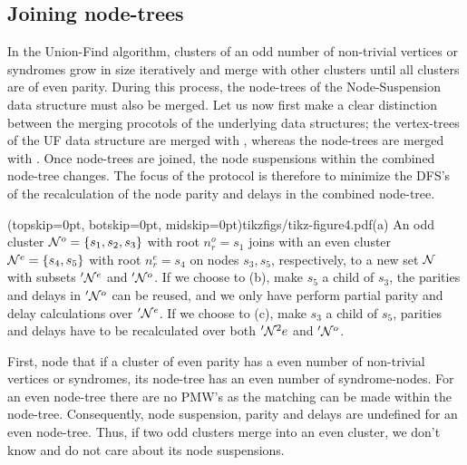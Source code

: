 \subsection{Joining node-trees}\label{sec:nodejoin}

In the Union-Find algorithm, clusters of an odd number of non-trivial vertices or syndromes grow in size iteratively and merge with other clusters until all clusters are of even parity. During this process, the node-trees of the Node-Suspension data structure must also be merged. Let us now first make a clear distinction between the merging procotols of the underlying data structures; the vertex-trees of the UF data structure are merged with , whereas the node-trees are merged with . Once node-trees are joined, the node suspensions within the combined node-tree changes. The focus of the  protocol is therefore to minimize the DFS's of the recalculation of the node parity and delays in the combined node-tree. 

\Figure[htb](topskip=0pt, botskip=0pt, midskip=0pt){tikzfigs/tikz-figure4.pdf}{(a) An odd cluster $\mathcal{N}^o=\{s_1, s_2, s_3\}$ with root $n^o_r = s_1$ joins with an even cluster $\mathcal{N}^e=\{s_4, s_5\}$ with root $n^e_r=s_4$ on nodes $s_3, s_5$, respectively, to a new set $\mathcal{N}$ with subsets $'\mathcal{N}^e$ and $'\mathcal{N}^o$.  If we choose to (b), make $s_5$ a child of $s_3$, the parities and delays in $'\mathcal{N}^o$ can be reused, and we only have perform partial parity and delay calculations over $'\mathcal{N}^e$. If we choose to (c), make $s_3$ a child of $s_5$, parities and delays have to be recalculated over both $'\mathcal{N}^2e$ and $'\mathcal{N}^o$. \label{fig4}}

First, node that if a cluster of even parity has a even number of non-trivial vertices or syndromes, its node-tree has an even number of syndrome-nodes. For an even node-tree there are no PMW's as the matching can be made within the node-tree. Consequently, node suspension, parity and delays are undefined for an even node-tree. Thus, if two odd clusters merge into an even cluster, we don't know and do not care about its node suspensions. 

